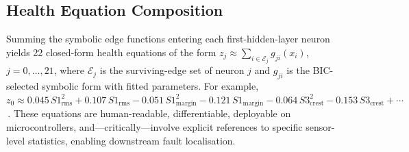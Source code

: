 \documentclass[conference]{IEEEtran}
\begin{document}
\subsection{Health Equation Composition}
Summing the symbolic edge functions entering each first-hidden-layer
neuron yields 22 closed-form health equations of the form
$z_j \approx \sum_{i \in \mathcal{E}_j} g_{ji}(x_i)$, $j=0,\ldots,21$,
where $\mathcal{E}_j$ is the surviving-edge set of neuron $j$ and
$g_{ji}$ is the BIC-selected symbolic form with fitted parameters.
For example, $z_0 \approx 0.045\,S1_{\text{rms}}^{2}+0.107\,S1_{\text{rms}}
-0.051\,S1_{\text{margin}}^{2}-0.121\,S1_{\text{margin}}
-0.064\,S3_{\text{crest}}^{2}-0.153\,S3_{\text{crest}}+\cdots$\,.
These equations are human-readable, differentiable, deployable
on microcontrollers, and---critically---involve explicit references
to specific sensor-level statistics, enabling downstream fault localisation.
\end{document}
